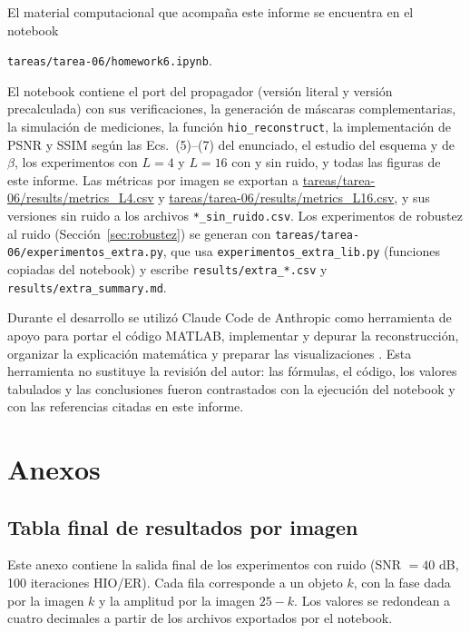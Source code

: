 \documentclass[11pt,a4paper]{article}
\newcommand{\hio}{\textsc{HIO}}
\newcommand{\er}{\textsc{ER}}
\begin{document}
El material computacional que acompaña este informe se encuentra en el notebook
\begin{center}
\texttt{tareas/tarea-06/homework6.ipynb}.
\end{center}
El notebook contiene el port del propagador (versión literal y versión precalculada) con sus verificaciones, la generación de máscaras complementarias, la simulación de mediciones, la función \texttt{hio\_reconstruct}, la implementación de PSNR y SSIM según las Ecs.~(5)--(7) del enunciado, el estudio del esquema y de $\beta$, los experimentos con $L=4$ y $L=16$ con y sin ruido, y todas las figuras de este informe. Las métricas por imagen se exportan a \url{tareas/tarea-06/results/metrics_L4.csv} y \url{tareas/tarea-06/results/metrics_L16.csv}, y sus versiones sin ruido a los archivos \texttt{*\_sin\_ruido.csv}. Los experimentos de robustez al ruido (Sección~\ref{sec:robustez}) se generan con \texttt{tareas/tarea-06/experimentos\_extra.py}, que usa \texttt{experimentos\_extra\_lib.py} (funciones copiadas del notebook) y escribe \texttt{results/extra\_*.csv} y \texttt{results/extra\_summary.md}.

Durante el desarrollo se utilizó Claude Code de Anthropic como herramienta de apoyo para portar el código MATLAB, implementar y depurar la reconstrucción, organizar la explicación matemática y preparar las visualizaciones \cite{claude-code}. Esta herramienta no sustituye la revisión del autor: las fórmulas, el código, los valores tabulados y las conclusiones fueron contrastados con la ejecución del notebook y con las referencias citadas en este informe.

\clearpage
\renewcommand{\refname}{Referencias}


\newpage

\appendix
\section{Anexos}
\label{app:anexos}

\subsection{Tabla final de resultados por imagen}
\label{app:tabla-final}

Este anexo contiene la salida final de los experimentos con ruido (SNR $=40$ dB, 100 iteraciones \hio{}/\er{}). Cada fila corresponde a un objeto $k$, con la fase dada por la imagen $k$ y la amplitud por la imagen $25-k$. Los valores se redondean a cuatro decimales a partir de los archivos exportados por el notebook.
\end{document}

